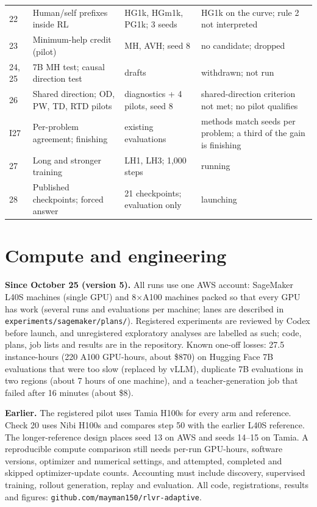 \documentclass[11pt]{article}
\begin{document}
\begin{longtable}{@{}P{0.9cm}P{3.3cm}P{4.6cm}P{5.2cm}@{}}
22 & Human/self prefixes inside RL & HG1k, HGm1k, PG1k; 3 seeds & HG1k on the curve; rule 2 not interpreted\\
23 & Minimum-help credit (pilot) & MH, AVH; seed 8 & no candidate; dropped\\
24, 25 & 7B MH test; causal direction test & drafts & withdrawn; not run\\
26 & Shared direction; OD, PW, TD, RTD pilots & diagnostics + 4 pilots, seed 8 & shared-direction criterion not met; no pilot qualifies\\
I27 & Per-problem agreement; finishing & existing evaluations & methods match seeds per problem; a third of the gain is finishing\\
27 & Long and stronger training & LH1, LH3; 1,000 steps & running\\
28 & Published checkpoints; forced answer & 21 checkpoints; evaluation only & launching\\
\bottomrule
\end{longtable}
\normalsize

\section{Compute and engineering}
\textbf{Since October 25 (version 5).} All runs use one AWS account: SageMaker L40S machines (single GPU) and 8$\times$A100 machines packed so that every GPU has work (several runs and evaluations per machine; lanes are described in \texttt{experiments/sagemaker/plans/}). Registered experiments are reviewed by Codex before launch, and unregistered exploratory analyses are labelled as such; code, plans, job lists and results are in the repository. Known one-off losses: 27.5 instance-hours (220 A100 GPU-hours, about \$870) on Hugging Face 7B evaluations that were too slow (replaced by vLLM), duplicate 7B evaluations in two regions (about 7 hours of one machine), and a teacher-generation job that failed after 16 minutes (about \$8).

\textbf{Earlier.} The registered pilot uses Tamia H100s for every arm and reference. Check 20 uses Nibi H100s and compares step 50 with the earlier L40S reference. The longer-reference design places seed 13 on AWS and seeds 14--15 on Tamia. A reproducible compute comparison still needs per-run GPU-hours, software versions, optimizer and numerical settings, and attempted, completed and skipped optimizer-update counts. Accounting must include discovery, supervised training, rollout generation, replay and evaluation. All code, registrations, results and figures: \texttt{github.com/mayman150/rlvr-adaptive}.
\end{document}
